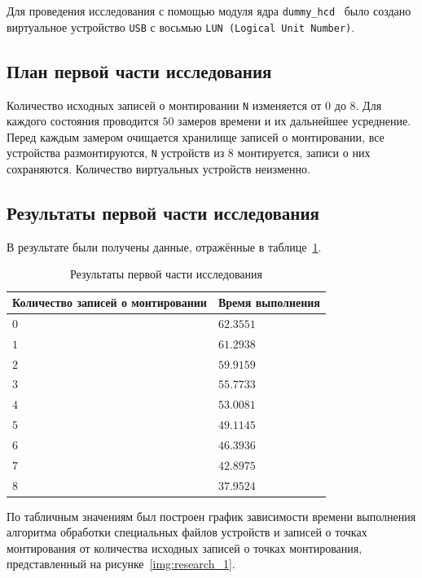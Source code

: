 Для проведения исследования с помощью модуля ядра \texttt{dummy\_hcd}~\cite{Dummy} было создано 
виртуальное устройство \texttt{USB} с восьмью \texttt{LUN (Logical Unit Number)}.

\subsection{План первой части исследования}

Количество исходных записей о монтировании \texttt{N} изменяется от $0$ до $8$. Для каждого состояния
проводится $50$ замеров времени и их дальнейшее усреднение. Перед каждым замером очищается хранилище записей
о монтировании, все устройства размонтируются, \texttt{N} устройств из $8$ монтируется, записи о них сохраняются.
Количество виртуальных устройств неизменно.

\subsection{Результаты первой части исследования}

В результате были получены данные, отражённые в таблице~\ref{tab:res_1}.

\begin{table}[H]
    \caption{Результаты первой части исследования}
    \begin{tabular}{|p{10cm}|p{5cm}|}
    \hline

    \textbf{Количество записей о монтировании}
    & \textbf{Время выполнения} \\
    \hline

    $0$ & $62.3551$ \\ \hline
    $1$ & $61.2938$ \\ \hline
    $2$ & $59.9159$ \\ \hline
    $3$ & $55.7733$ \\ \hline
    $4$ & $53.0081$ \\ \hline
    $5$ & $49.1145$ \\ \hline
    $6$ & $46.3936$ \\ \hline
    $7$ & $42.8975$ \\ \hline
    $8$ & $37.9524$ \\ \hline

    \end{tabular}
    \label{tab:res_1}
\end{table}

По табличным значениям был построен график зависимости времени выполнения алгоритма 
обработки специальных файлов устройств и записей о точках монтирования от количества 
исходных записей о точках монтирования, представленный на рисунке~\ref{img:research_1}.

